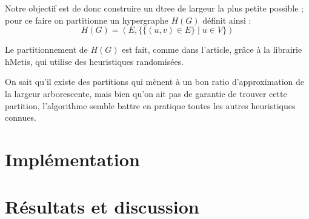 \documentclass{article}
\begin{document}
Notre objectif est de donc construire un dtree de largeur la plus
petite possible ; pour ce faire on partitionne un hypergraphe $H(G)$
définit ainsi :
$$ H(G) = (E,\{ \{ (u,v) \in E \} \mid u \in V \}) $$

Le partitionnement de $H(G)$ est fait, comme dans l'article, grâce à
la librairie hMetis, qui utilise des heuristiques randomisées.

On sait qu'il existe des partitions qui mènent à un bon ratio
d'approximation de la largeur arborescente, mais bien qu'on ait pas de
garantie de trouver cette partition, l'algorithme semble battre en
pratique toutes les autres heuristiques connues.

\section{Implémentation}

\section{Résultats et discussion}




\end{document}

